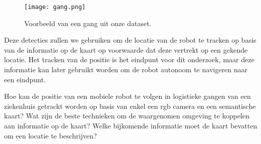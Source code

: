 \begin{figure}[h]
    \centering
    \texttt{[image: gang.png]}
    \caption{Voorbeeld van een gang uit onze dataset.}
    \label{fig:gang}
\end{figure}

Deze detecties zullen we gebruiken om de locatie van de robot te tracken op basis van de informatie op de kaart op voorwaarde dat deze vertrekt op een gekende locatie.
Het tracken van de positie is het eindpunt voor dit onderzoek, maar deze informatie kan later gebruikt worden om de robot autonoom te navigeren naar een eindpunt.

\pagebreak
Hoe kan de positie van een mobiele robot te volgen in logistieke gangen van een ziekenhuis getrackt worden op basis van enkel een \gls{rgb} camera en een
semantische kaart?
Wat zijn de beste technieken om de waargenomen omgeving te koppelen aan informatie op de kaart?
Welke bijkomende informatie moet de kaart bevatten om een locatie te beschrijven?